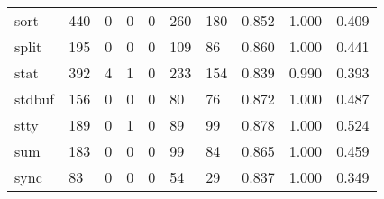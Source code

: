 \begin{longtable}{lp{1.3cm}p{1.3cm}p{1.3cm}p{1.3cm}p{1.3cm}p{1.3cm}p{1.3cm}p{1.3cm}p{1.3cm}}
sort      &                    440 &                                             0 &                                            0 &                                           0 &                                          260 &                                        180 &                                0.852 &                                  1.000 &                                0.409 \\
split     &                    195 &                                             0 &                                            0 &                                           0 &                                          109 &                                         86 &                                0.860 &                                  1.000 &                                0.441 \\
stat      &                    392 &                                             4 &                                            1 &                                           0 &                                          233 &                                        154 &                                0.839 &                                  0.990 &                                0.393 \\
stdbuf    &                    156 &                                             0 &                                            0 &                                           0 &                                           80 &                                         76 &                                0.872 &                                  1.000 &                                0.487 \\
stty      &                    189 &                                             0 &                                            1 &                                           0 &                                           89 &                                         99 &                                0.878 &                                  1.000 &                                0.524 \\
sum       &                    183 &                                             0 &                                            0 &                                           0 &                                           99 &                                         84 &                                0.865 &                                  1.000 &                                0.459 \\
sync      &                     83 &                                             0 &                                            0 &                                           0 &                                           54 &                                         29 &                                0.837 &                                  1.000 &                                0.349 \\

\end{longtable}
